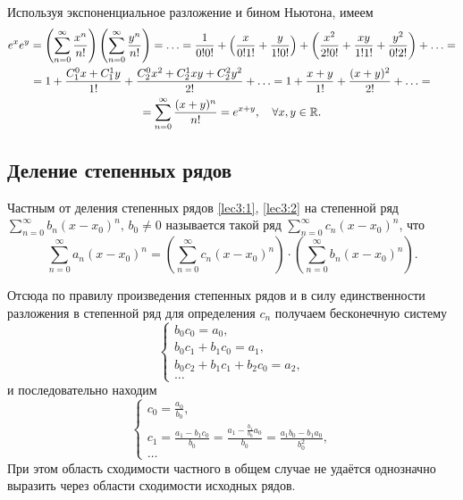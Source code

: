 \documentclass[../../main.tex]{subfiles}
\begin{document}
    \begin{example}
        Используя экспоненциальное разложение и бином Ньютона, имеем
        \begin{multline*} 
            e^xe^y = \left(\sum\limits_{n = 0}^{\infty}\frac{x^n}{n!} \right)
            \left(\sum\limits_{n = 0}^{\infty}\frac{y^n}{n!} \right) = \ldots 
            = 
            \frac{1}{0!0!} + \left(\frac x{0!1!} + \frac y {1!0!}\right) + 
            \left(\frac{x^2}{2!0!} + \frac{xy}{1!1!} + \frac{y^2}{0!2!}\right) 
            + \ldots = \\ = 1 + \frac{C_1^0 x + C_1^1 y}{1!} + \frac{C_2^0 x^2 
            + C_2^1xy + C_2^2 y^2}{2!} + \ldots = 1 + \frac{x + y}{1!} + 
            \frac{(x + y)^2}{2!} + \ldots = \\ = \sum\limits_{n = 0}^{\infty} 
            \frac{(x + y)^n}{n!} = e^{x + y}, \quad \forall x, y \in \mathbb{R}.
        \end{multline*}
    \end{example}

    \subsection{Деление степенных рядов}

    Частным от деления степенных рядов \eqref{lec3:1}, \eqref{lec3:2} на 
    степенной ряд $\sum\limits_{n = 0}^{\infty}b_n(x - x_0)^n, \, b_0 
    \ne 0$ называется такой ряд $\sum\limits_{n = 0}^{\infty}c_n(x - x_0)^n$, 
    что 
    \[\sum\limits_{n = 0}^{\infty}a_n(x - x_0)^n = 
    \left(\sum\limits_{n = 0}^{\infty}c_n(x - x_0)^n\right) \cdot 
    \left(\sum\limits_{n = 0}^{\infty}b_n(x - x_0)^n\right). \]
    
    Отсюда по правилу произведения степенных рядов и в силу единственности 
    разложения в степенной ряд для определения $c_n$ получаем бесконечную 
    систему 
    \[
    \begin{cases}
        b_0c_0 = a_0, \\ 
        b_0c_1 + b_1c_0 = a_1, \\
        b_0c_2 + b_1c_1 + b_2c_0 = a_2, \\
        \ldots
    \end{cases} 
    \]
    и последовательно находим
    \[ 
    \begin{cases}
    c_0 = \frac{a_0}{b_0}, \\ 
    c_1 = \frac{a_1 - b_1c_0}{b_0} = \frac{a_1 - \frac{b_1}{b_0}a_0}{b_0} = 
        \frac{a_1b_0-b_1a_0}{b_0^2}, \\
    \ldots
    \end{cases} 
    \]
    При этом область сходимости частного в общем случае не удаётся однозначно 
    выразить через области сходимости исходных рядов.
\end{document}
